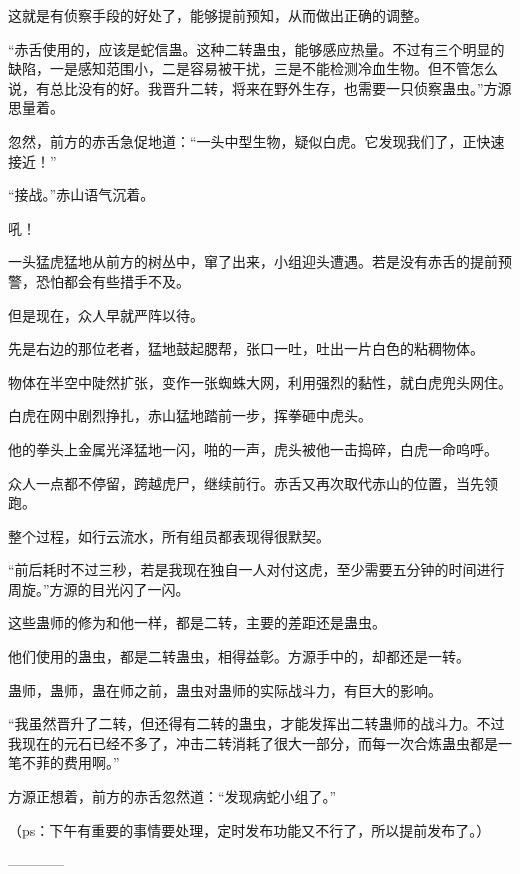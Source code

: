 \begin{this_body}
这就是有侦察手段的好处了，能够提前预知，从而做出正确的调整。

“赤舌使用的，应该是蛇信蛊。这种二转蛊虫，能够感应热量。不过有三个明显的缺陷，一是感知范围小，二是容易被干扰，三是不能检测冷血生物。但不管怎么说，有总比没有的好。我晋升二转，将来在野外生存，也需要一只侦察蛊虫。”方源思量着。

忽然，前方的赤舌急促地道：“一头中型生物，疑似白虎。它发现我们了，正快速接近！”

“接战。”赤山语气沉着。

吼！

一头猛虎猛地从前方的树丛中，窜了出来，小组迎头遭遇。若是没有赤舌的提前预警，恐怕都会有些措手不及。

但是现在，众人早就严阵以待。

先是右边的那位老者，猛地鼓起腮帮，张口一吐，吐出一片白色的粘稠物体。

物体在半空中陡然扩张，变作一张蜘蛛大网，利用强烈的黏性，就白虎兜头网住。

白虎在网中剧烈挣扎，赤山猛地踏前一步，挥拳砸中虎头。

他的拳头上金属光泽猛地一闪，啪的一声，虎头被他一击捣碎，白虎一命呜呼。

众人一点都不停留，跨越虎尸，继续前行。赤舌又再次取代赤山的位置，当先领跑。

整个过程，如行云流水，所有组员都表现得很默契。

“前后耗时不过三秒，若是我现在独自一人对付这虎，至少需要五分钟的时间进行周旋。”方源的目光闪了一闪。

这些蛊师的修为和他一样，都是二转，主要的差距还是蛊虫。

他们使用的蛊虫，都是二转蛊虫，相得益彰。方源手中的，却都还是一转。

蛊师，蛊师，蛊在师之前，蛊虫对蛊师的实际战斗力，有巨大的影响。

“我虽然晋升了二转，但还得有二转的蛊虫，才能发挥出二转蛊师的战斗力。不过我现在的元石已经不多了，冲击二转消耗了很大一部分，而每一次合炼蛊虫都是一笔不菲的费用啊。”

方源正想着，前方的赤舌忽然道：“发现病蛇小组了。”

（ps：下午有重要的事情要处理，定时发布功能又不行了，所以提前发布了。）

------------

\end{this_body}

